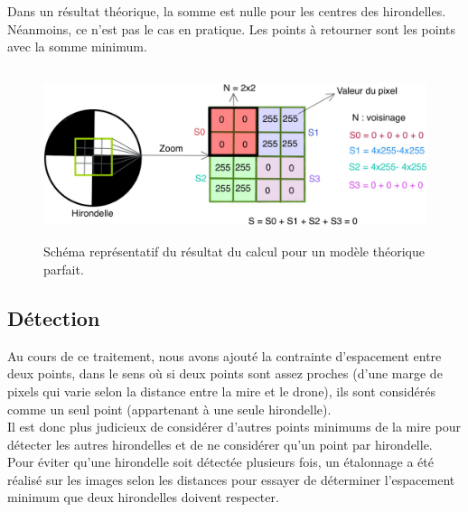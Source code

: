 \documentclass[12pt]{article}
\begin{document}
Dans un résultat théorique, la somme est nulle pour les centres des hirondelles. Néanmoins, ce n'est pas le cas en pratique. Les points à retourner  sont les points avec la somme minimum.

\begin{figure}[H]
\centering
\includegraphics[height=5cm]{B_theorique.png}
\caption{Schéma représentatif du résultat du calcul pour un modèle théorique parfait. }
\label{fig:calcul_theorique}
\end{figure}

\subsection{Détection }
Au cours de ce traitement, nous avons ajouté la contrainte d'espacement entre deux points, dans le sens où si deux points sont assez proches (d'une marge de pixels qui varie selon la distance entre la mire et le drone), ils sont considérés comme un seul point (appartenant à une seule hirondelle).\\ Il est donc plus judicieux de considérer d'autres points minimums de la mire pour détecter les autres hirondelles et de ne considérer qu'un point par hirondelle.\\
Pour éviter qu'une hirondelle soit détectée plusieurs fois,  un étalonnage a été réalisé sur les images selon les distances pour essayer de déterminer l'espacement minimum que deux hirondelles doivent respecter.
\end{document}
